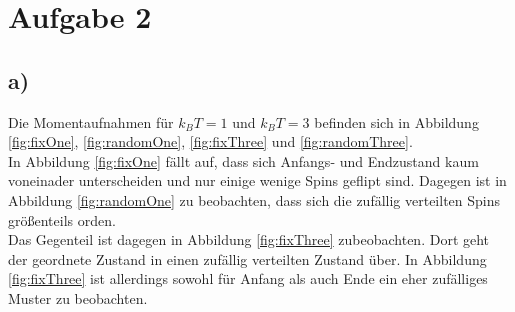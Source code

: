 \section*{Aufgabe 2}

\subsection*{a)}
Die Momentaufnahmen für $k_B T = 1$ und $k_B T = 3$ befinden sich in Abbildung \ref{fig:fixOne}, \ref{fig:randomOne}, \ref{fig:fixThree} und \ref{fig:randomThree}. \\

In Abbildung \ref{fig:fixOne} fällt auf, dass sich Anfangs- und Endzustand kaum voneinader unterscheiden und nur einige wenige Spins geflipt sind. Dagegen ist in Abbildung \ref{fig:randomOne} zu beobachten, dass sich die zufällig verteilten Spins größenteils orden. \\

Das Gegenteil ist dagegen in Abbildung \ref{fig:fixThree} zubeobachten. Dort geht der geordnete Zustand in einen zufällig verteilten Zustand über. In Abbildung \ref{fig:fixThree} ist allerdings sowohl für Anfang als auch Ende ein eher zufälliges Muster zu beobachten.

